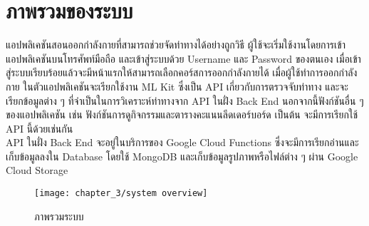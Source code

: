 \section{ภาพรวมของระบบ}

แอปพลิเคชันสอนออกกำลังกายที่สามารถช่วยจัดท่าทางได้อย่างถูกวิธี ผู้ใช้จะเริ่มใช้งานโดยการเข้าแอปพลิเคชันบนโทรศัพท์มือถือ และเข้าสู่ระบบด้วย Username และ Password ของตนเอง เมื่อเข้าสู่ระบบเรียบร้อยแล้วจะมีหน้าแรกให้สามารถเลือกคอร์สการออกกำลังกายได้ เมื่อผู้ใช้ทำการออกกำลังกาย ในตัวแอปพลิเคชันจะเรียกใช้งาน ML Kit ซึ่งเป็น API  เกี่ยวกับการตรวจจับท่าทาง และจะเรียกข้อมูลต่าง ๆ ที่จำเป็นในการวิเคราะห์ท่าทางจาก API ในฝั่ง Back End นอกจากนี้ฟังก์ชันอื่น ๆ ของแอปพลิเคชัน เช่น ฟังก์ชันการดูกิจกรรมและตารางคะแนนลีดเดอร์บอร์ด เป็นต้น จะมีการเรียกใช้ API นี้ด้วยเช่นกัน
\\\indent
API ในฝั่ง Back End จะอยู่ในบริการของ Google Cloud Functions ซึ่งจะมีการเรียกอ่านและเก็บข้อมูลลงใน Database โดยใช้ MongoDB และเก็บข้อมูลรูปภาพหรือไฟล์ต่าง ๆ ผ่าน Google Cloud Storage
\begin{figure}
    \texttt{[image: chapter\_3/system overview]}
    \caption{ภาพรวมระบบ}
\end{figure}
